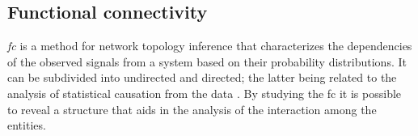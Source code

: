 \subsection{Functional connectivity}

\emph{\ac{fc}} is a method for network topology inference that characterizes the dependencies of the observed signals from a system based on their probability distributions\cite{Friston2011Functionaleffectiveconnectivity}. It can be subdivided into undirected and directed; the latter being related to the analysis of statistical causation from the data \cite{Bastos2016tutorialreviewfunctional}. By studying the \ac{fc}  it is possible to reveal a structure that aids in the analysis of the interaction among the entities.

